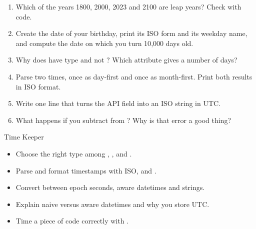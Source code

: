 \begin{practice}
\begin{enumerate}[nosep,leftmargin=*]
  \item Which of the years 1800, 2000, 2023 and 2100 are leap years? Check with code.
  \item Create the date of your birthday, print its ISO form and its weekday name, and compute the
        date on which you turn 10{,}000 days old.
  \item Why does  have type  and not
        ? Which attribute gives a number of days?
  \item Parse  two times, once as day-first and once as month-first. Print both
        results in ISO format.
  \item Write one line that turns the API field  into an ISO string in UTC.
  \item What happens if you subtract  from ?
        Why is that error a good thing?
\end{enumerate}
\end{practice}

\begin{achievement}{Time Keeper}
\begin{itemize}[nosep,leftmargin=*]
  \item Choose the right type among , ,  and .
  \item Parse and format timestamps with ISO,  and .
  \item Convert between epoch seconds, aware datetimes and strings.
  \item Explain naive versus aware datetimes and why you store UTC.
  \item Time a piece of code correctly with .
\end{itemize}
\end{achievement}
